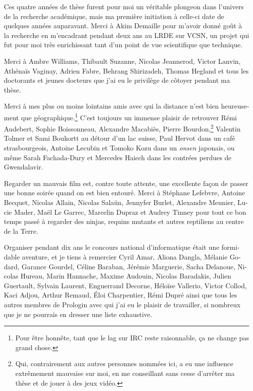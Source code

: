 \begin{otherlanguage}{french}
\begin{SingleSpace}
  Ces quatre années de thèse furent pour moi un véritable plongeon dans
  l'univers de la recherche académique, mais ma première initiation à celle-ci
  date de quelques années auparavant. Merci à Akim Demaille pour m'avoir donné
  goût à la recherche en m'encadrant pendant deux ans au LRDE sur VCSN, un
  projet qui fut pour moi très enrichissant tant d'un point de vue
  scientifique que technique.

  Merci à Ambre Williams, Thibault Suzanne, Nicolas Jeannerod, Victor Lanvin,
  Athénaïs Vaginay, Adrien Fabre, Behrang Shirizadeh, Thomas Hegland et tous
  les doctorants et jeunes docteurs que j'ai eu le privilège de côtoyer pendant
  ma thèse.

  Merci à mes plus ou moins lointains amis avec qui la distance n'est
  bien heureusement que géographique.\footnote{Pour être honnête, tant que
  le lag sur IRC reste raisonnable, ça ne change pas grand chose.} C'est
  toujours un immense plaisir de retrouver Rémi Audebert, Sophie Boissonneau,
  Alexandre Macabiès, Pierre Bourdon,\footnote{Qui, contrairement aux autres
  personnes nommées ici, a eu une influence extrêmement mauvaise sur moi, en me
  conseillant sans cesse d'arrêter ma thèse et de jouer à des jeux vidéo.}
  Valentin Tolmer et Sami Boukortt au détour d'un lac suisse, Paul Hervot dans
  un café strasbourgeois, Antoine Lecubin et Tomoko Kozu dans un
  \emph{onsen} japonais, ou même Sarah Fachada-Dury et Mercedes Haiech dans
  les contrées perdues de Gwendalavir.

  Regarder un mauvais film est, contre toute attente, une excellente façon de
  passer une bonne soirée quand on est bien entouré. Merci à Stéphane Lefebvre,
  Antoine Becquet, Nicolas Allain, Nicolas Salaün, Jennyfer Burlet, Alexandre
  Meunier, Lucie Mader, Maël Le Garrec, Marcelin Dupraz et Audrey Tinney pour
  tout ce bon temps passé à regarder des ninjas, requins mutants et autres
  reptiliens au centre de la Terre.

  Organiser pendant dix ans le concours national d'informatique était une
  formidable aventure, et je tiens à remercier Cyril Amar, Aliona Dangla,
  Mélanie Godard, Garance Gourdel, Céline Baraban, Jérémie Marguerie, Sacha
  Delanoue, Nicolas Hureau, Marin Hannache, Maxime Audouin, Nicolas Baradakis,
  Julien Guertault, Sylvain Laurent, Enguerrand Decorne, Héloïse Vallerio,
  Victor Collod, Kaci Adjou, Arthur Remaud, Éloi Charpentier, Rémi Dupré ainsi
  que tous les autres membres de Prologin avec qui j'ai eu le plaisir de
  travailler, si nombreux que je ne pourrais en dresser une liste exhaustive.


\end{SingleSpace}
\end{otherlanguage}

